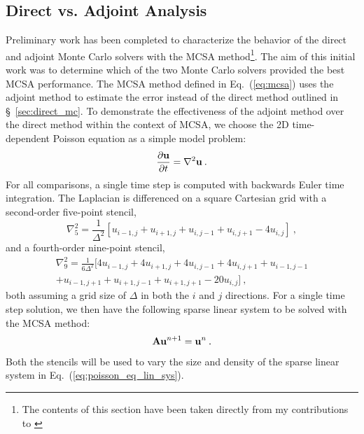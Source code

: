 \subsection{Direct vs. Adjoint Analysis}
\label{subsec:mcsa_direct_vs_adjoint}
Preliminary work has been completed to characterize the behavior of
the direct and adjoint Monte Carlo solvers with the MCSA
method\footnote{The contents of this section have been taken directly
  from my contributions to \citep{evans_monte_2012}}. The aim of this
initial work was to determine which of the two Monte Carlo solvers
provided the best MCSA performance. The MCSA method defined in
Eq.~(\ref{eq:mcsa}) uses the adjoint method to estimate the error
instead of the direct method outlined in \S~\ref{sec:direct_mc}. To
demonstrate the effectiveness of the adjoint method over the direct
method within the context of MCSA, we choose the 2D time-dependent
Poisson equation as a simple model problem:
\begin{equation}
  \frac{\partial \mathbf{u}}{\partial t} = \nabla^2 \mathbf{u}\:.
  \label{eq:poisson_equation}
\end{equation}
For all comparisons, a single time step is computed with backwards
Euler time integration. The Laplacian is differenced on a square
Cartesian grid with a second-order five-point stencil,
\begin{equation}
  \nabla^2_5 = \frac{1}{\Delta^2}[u_{i-1,j} + u_{i+1,j} + u_{i,j-1} +
    u_{i,j+1} - 4 u_{i,j}]\:,
  \label{eq:five_point_stencil}
\end{equation}
and a fourth-order nine-point stencil,
\begin{multline}
  \nabla^2_9 = \frac{1}{6\Delta^2}[4 u_{i-1,j} + 4 u_{i+1,j} + 4
    u_{i,j-1} + 4 u_{i,j+1} + u_{i-1,j-1}\\ + u_{i-1,j+1} +
    u_{i+1,j-1} + u_{i+1,j+1} - 20 u_{i,j}]\:,
  \label{eq:nine_point_stencil}
\end{multline}
both assuming a grid size of $\Delta$ in both the $i$ and $j$
directions. For a single time step solution, we then have the
following sparse linear system to be solved with the MCSA method:
\begin{equation}
  \mathbf{A} \mathbf{u}^{n+1} = \mathbf{u}^n\:.
  \label{eq:poisson_eq_lin_sys}
\end{equation}
Both the stencils will be used to vary the size and density of the
sparse linear system in Eq.~(\ref{eq:poisson_eq_lin_sys}).

